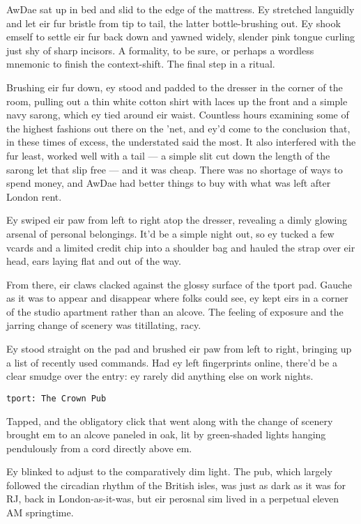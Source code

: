 AwDae sat up in bed and slid to the edge of the mattress. Ey stretched languidly and let eir fur bristle from tip to tail, the latter bottle-brushing out. Ey shook emself to settle eir fur back down and yawned widely, slender pink tongue curling just shy of sharp incisors. A formality, to be sure, or perhaps a wordless mnemonic to finish the context-shift. The final step in a ritual.

Brushing eir fur down, ey stood and padded to the dresser in the corner of the room, pulling out a thin white cotton shirt with laces up the front and a simple navy sarong, which ey tied around eir waist. Countless hours examining some of the highest fashions out there on the 'net, and ey'd come to the conclusion that, in these times of excess, the understated said the most. It also interfered with the fur least, worked well with a tail --- a simple slit cut down the length of the sarong let that slip free --- and it was cheap. There was no shortage of ways to spend money, and AwDae had better things to buy with what was left after London rent.

Ey swiped eir paw from left to right atop the dresser, revealing a dimly glowing arsenal of personal belongings. It'd be a simple night out, so ey tucked a few vcards and a limited credit chip into a shoulder bag and hauled the strap over eir head, ears laying flat and out of the way.

From there, eir claws clacked against the glossy surface of the tport pad. Gauche as it was to appear and disappear where folks could see, ey kept eirs in a corner of the studio apartment rather than an alcove. The feeling of exposure and the jarring change of scenery was titillating, racy.

Ey stood straight on the pad and brushed eir paw from left to right, bringing up a list of recently used commands. Had ey left fingerprints online, there'd be a clear smudge over the entry: ey rarely did anything else on work nights.

\texttt{tport:\ The\ Crown\ Pub}

Tapped, and the obligatory click that went along with the change of scenery brought em to an alcove paneled in oak, lit by green-shaded lights hanging pendulously from a cord directly above em.

Ey blinked to adjust to the comparatively dim light. The pub, which largely followed the circadian rhythm of the British isles, was just as dark as it was for RJ, back in London-as-it-was, but eir perosnal sim lived in a perpetual eleven AM springtime.

